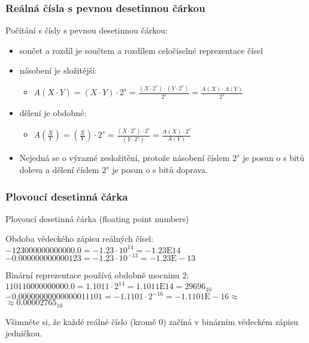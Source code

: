 \documentclass{beamer}
\begin{document}
\begin{frame}
\frametitle{Reálná čísla s pevnou desetinnou čárkou}

Počítání s čísly s pevnou desetinnou čárkou:

\begin{itemize}
\item součet a rozdíl je součtem a rozdílem celočíselné reprezentace čísel
\item násobení je složitější:
\begin{itemize}
\item $A(X \cdot Y) = (X \cdot Y ) \cdot 2^s = \frac{(X \cdot 2^s)\cdot( Y\cdot 2^s) }{2^s} = \frac{A(X) \cdot A(Y)}{2^s}$
\end{itemize}
\item dělení je obdobné:
\begin{itemize}
\item $A(\frac{X}{Y}) = (\frac{X}{Y}) \cdot 2^s = \frac{(X \cdot 2^s)\cdot2^s }{( Y\cdot 2^s)} = \frac{A(X) \cdot 2^s}{A(Y)}$
\end{itemize}
\item Nejedná se o výrazné zesložitění, protože násobení číslem $2^s$ je posun o s bitů doleva a dělení číslem $2^s$ je posun o s bitů doprava.
\end{itemize}



\end{frame}


\begin{frame}
\frametitle{Plovoucí desetinná čárka}

Plovoucí desetinná čárka (floating point numbers)

\bigskip

Obdoba vědeckého zápisu reálných čísel:
$-123 000 000 000 000.0 = -1.23 \cdot 10^{14} = -1.23\text{E} 14$\\
$-0.000 000 000 000 123 = -1.23 \cdot 10^{-13} = -1.23\text{E}-13$\\

\bigskip

Binární reprezentace používá obdobně mocninu 2:\\
$110 1100 0000 0000.0 = 1.1011 \cdot 2^{14} = 1.1011\text{E} 14 = 29696_{10}$\\
$-0.0000 0000 0000 0001 1101 = -1.1101 \cdot 2^{-16} = -1.1101\text{E}-16 \approx$\\
\phantom{xxxxxxxxxxxxxxxxxxxxxxxxxxxxxxxxxxxxxxxxxx}$\approx0.00002765_{10}$\\

\bigskip

Všimněte si, že každé reálné číslo (kromě 0) začíná v binárním vědeckém zápisu jedničkou.


\end{frame}
\end{document}
